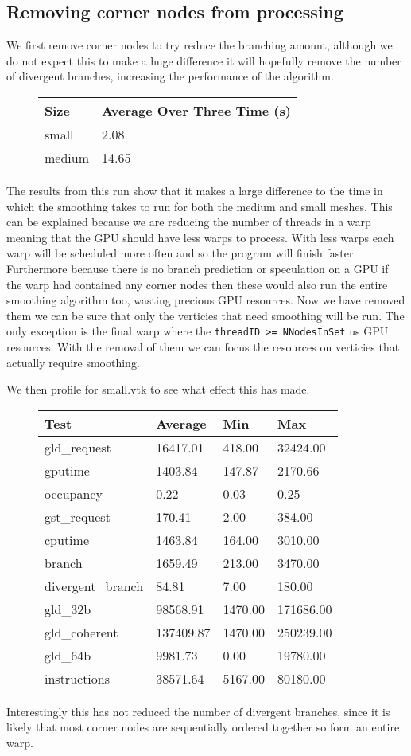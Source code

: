 \subsection*{Removing corner nodes from processing}
We first remove corner nodes to try reduce the branching amount, although we do not expect this to make a huge difference it will hopefully remove the number of divergent branches, increasing the performance of the algorithm. \\
\begin{figure}[H]\centering \begin{tabular}{ l | l }
  \hline
  Size & Average Over Three Time (s)\\
  \hline
  \hline
  small & 2.08 \\
  medium & 14.65 \\
  \hline
\end{tabular} \end{figure}

The results from this run show that it makes a large difference to the time in which the smoothing takes to run for both the medium and small meshes. This can be explained because we are reducing the number of threads in a warp meaning that the GPU should have less warps to process. With less warps each warp will be scheduled more often and so the program will finish faster. Furthermore because there is no branch prediction or speculation on a GPU if the warp had contained any corner nodes then these would also run the entire smoothing algorithm too, wasting precious GPU resources. Now we have removed them we can be sure that only the verticies that need smoothing will be run.
The only exception is the final warp where the \verb!threadID >= NNodesInSet!
us GPU resources.
With the removal of them we can focus the resources on verticies that actually require smoothing.

We then profile for small.vtk to see what effect this has made.\\
\begin{figure}[H]\centering \begin{tabular}{ l | l | l | l}
\hline
Test & Average & Min & Max \\
\hline
\hline
gld\_request & 16417.01 & 418.00 & 32424.00 \\
gputime & 1403.84 & 147.87 & 2170.66 \\
occupancy & 0.22 & 0.03 & 0.25 \\
gst\_request & 170.41 & 2.00 & 384.00 \\
cputime & 1463.84 & 164.00 & 3010.00 \\
branch & 1659.49 & 213.00 & 3470.00 \\
divergent\_branch & 84.81 & 7.00 & 180.00 \\
gld\_32b & 98568.91 & 1470.00 & 171686.00 \\
gld\_coherent & 137409.87 & 1470.00 & 250239.00 \\
gld\_64b & 9981.73 & 0.00 & 19780.00 \\
instructions & 38571.64 & 5167.00 & 80180.00 \\
\hline
\end{tabular} \end{figure}

Interestingly this has not reduced the number of divergent branches, since it is likely that most corner nodes are sequentially ordered together so form an entire warp.